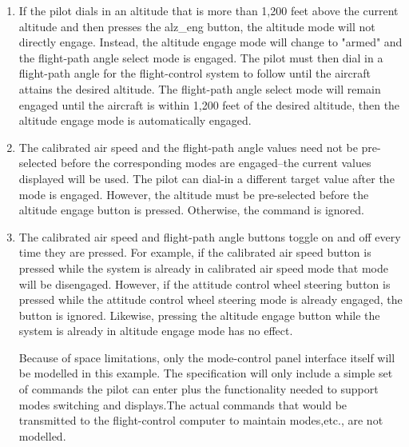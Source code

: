 \documentclass{article}
\begin{document}
\begin{enumerate}
\item If the pilot dials in an altitude that is more than 1,200 feet above the current altitude and
then presses the alz\_eng button, the altitude mode will not directly engage. Instead, the altitude
engage mode will change to "armed" and the flight-path angle select mode is engaged. The pilot
must then dial in a flight-path angle for the flight-control system to follow until the aircraft attains 
the desired altitude. The flight-path angle select mode will remain engaged until the aircraft is within
 1,200 feet of the desired altitude, then the altitude engage mode is automatically engaged.

\item The calibrated air speed and the flight-path angle values need not be pre-selected before the
corresponding modes are engaged--the current values displayed will be used. The pilot can dial-in
a different target value after the mode is engaged. However, the altitude must be pre-selected
before the altitude engage button is pressed. Otherwise, the command is ignored.

\item The calibrated air speed and flight-path angle buttons toggle on and off every time they are
pressed. For example, if the calibrated air speed button is pressed while the system is already in
calibrated air speed mode that mode will be disengaged. However, if the attitude control wheel
steering button is pressed while the attitude control wheel steering mode is already engaged, the
button is ignored. Likewise, pressing the altitude engage button while the system is already in
altitude engage mode has no effect.

Because of space limitations, only the mode-control panel interface itself will be modelled in this
example. The specification will only include a simple set of commands the pilot can enter plus the 
functionality needed to support modes switching and displays.The actual commands that would
be transmitted to the flight-control computer to maintain modes,etc., are not modelled.

\end{enumerate}
\end{document}
